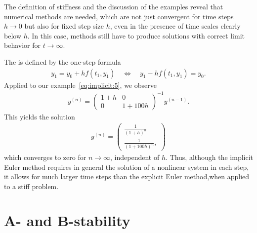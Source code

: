 \begin{remark}
  \label{remark:impl:1}
  The definition of stiffness and the discussion of the examples
  reveal that numerical methods are needed, which are not just
  convergent for time steps $h\to 0$ but also for fixed step size $h$,
  even in the presence of time scales clearly below $h$. In this case,
  methods still have to produce solutions with correct limit behavior
  for $t\to\infty$.
\end{remark}

\begin{example}
  The  is defined by the one-step
  formula
  \begin{gather}
    \label{eq:implicit:17}
    y_1 = y_0 + hf(t_1, y_1)
    \quad \Leftrightarrow \quad
    y_1 - h f(t_1, y_1) = y_0.
  \end{gather}
  Applied to our example~\eqref{eq:implicit:5}, we observe
  \begin{gather*}
    y^{(n)} =
    \begin{pmatrix}
      1 + h & 0 \\ 0 & 1+100h
    \end{pmatrix}^{-1}
    y^{(n-1)}.
  \end{gather*}
  This yields the solution
  \begin{gather*}
    y^{(n)} =
    \begin{pmatrix}
      \frac1{(1+h)^n} \\
      \frac1{(1+100h)^n},
    \end{pmatrix}
  \end{gather*}
  which converges to zero for $n\to \infty$, independent of $h$. Thus,
  although the implicit Euler method requires in general the solution
  of a nonlinear system in each step, it allows for much larger time
  steps than the explicit Euler method,when applied to a stiff problem.
\end{example}
\section{A- and B-stability}

